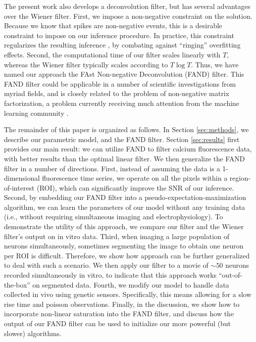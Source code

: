 The present work also develops a deconvolution filter, but has several advantages over the Wiener filter.  First, we impose a non-negative constraint on the solution. Because we know that spikes are non-negative events, this is a desirable constraint to impose on our inference procedure.  In practice, this constraint regularizes the resulting inference \cite{LeeSeung99, LeeSeung01, HuysPaninski06}, by combating against ``ringing'' overfitting effects. Second, the computational time of our filter scales linearly with $T$, whereas the Wiener filter typically scales according to $T \log T$.  Thus, we have named our approach the FAst Non-negative Deconvolution (FAND) filter.  This FAND filter could be applicable in a number of scientific investigations from myriad fields, and is closely related to the problem of non-negative matrix factorization, a problem currently receiving much attention from the machine learning community \cite{PortugalVicente94, LeeSeung99, LeeSeung01, LeeNg06, OGradyPearlmutter06}.

The remainder of this paper is organized as follows.  In Section \ref{sec:methods}, we describe our parametric model, and the FAND filter.  Section \ref{sec:results} first provides our main result: we can utilize FAND to filter calcium fluorescence data, with better results than the optimal linear filter.  We then generalize the FAND filter in a number of directions.  First, instead of assuming the data is a 1-dimensional fluorescence time series, we operate on  all the pixels within a region-of-interest (ROI), which can significantly improve the SNR of our inference. Second, by embedding our FAND filter into a pseudo-expectation-maximization algorithm, we can learn the parameters of our model without any training data (i.e., without requiring simultaneous imaging and electrophysiology).  To demonstrate the utility of this approach, we compare our filter and the Wiener filter's output on in vitro data. Third, when imaging a large population of neurons simultaneously, sometimes segmenting the image to obtain one neuron per ROI is difficult.  Therefore, we show how approach can be further generalized to deal with such a scenario.  We then apply our filter to a movie of $\sim 50$ neurons recorded simultaneously in vitro, to indicate that this approach works ``out-of-the-box'' on segmented data.  Fourth, we modify our model to handle data collected in vivo using genetic sensors.  Specifically, this means allowing for a slow rise time and poisson observations.  Finally, in the discussion, we show how to incorporate non-linear saturation into the FAND filter, and discuss how the output of our FAND filter can be used to initialize our more powerful (but slower) algorithms.